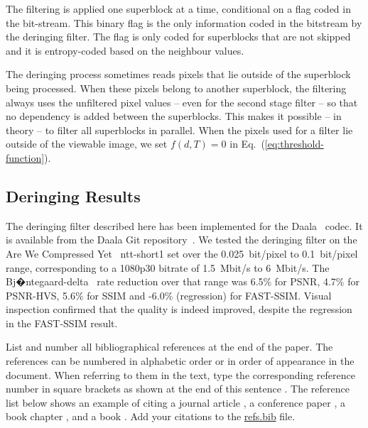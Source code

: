 \documentclass[smallabstract,smallcaptions]{dccpaper}
\begin{document}
The filtering is applied one superblock at a time, conditional on
a flag coded in the bit-stream. This binary flag is the only information
coded in the bitstream by the deringing filter. The flag is only coded
for superblocks that are not skipped and it is entropy-coded based
on the neighbour values.

The deringing process sometimes reads pixels that lie outside of the
superblock being processed. When these pixels belong to another superblock,
the filtering always uses the unfiltered pixel values -- even for
the second stage filter -- so that no dependency is added between
the superblocks. This makes it possible -- in theory -- to filter
all superblocks in parallel. When the pixels used for a filter lie
outside of the viewable image, we set $f\left(d,T\right)=0$ in Eq.~(\ref{eq:threshold-function}).


\subsection{Deringing Results}

The deringing filter described here has been implemented for the Daala~\cite{Daala}
codec. It is available from the Daala Git repository~\cite{Daala-Git}.
We tested the deringing filter on the Are We Compressed Yet~\cite{AWCY}
ntt-short1 set over the 0.025~bit/pixel to 0.1~bit/pixel range,
corresponding to a 1080p30 bitrate of 1.5~Mbit/s to 6~Mbit/s. The
Bj�ntegaard-delta~\cite{Testing-draft} rate reduction over that
range was 6.5\% for PSNR, 4.7\% for PSNR-HVS, 5.6\% for SSIM and -6.0\%
(regression) for FAST-SSIM. Visual inspection confirmed that the quality
is indeed improved, despite the regression in the FAST-SSIM result.




List and number all bibliographical references at the end of the
paper. The references can be numbered in alphabetic order or in
order of appearance in the document. When referring to them in
the text, type the corresponding reference number in square
brackets as shown at the end of this sentence \cite{Fow2009}.
The reference list below shows an example of citing a
journal article \cite{Fow2009}, a conference paper \cite{Fow2008},
a book chapter \cite{FD2011}, and a book \cite{Par1998}.
Add your citations to the \url{refs.bib} file.



\end{document}
